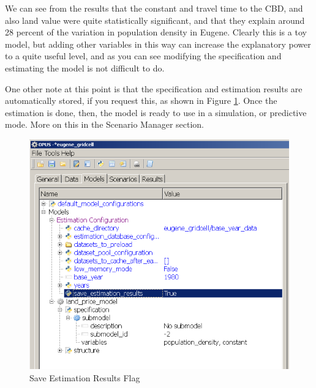 We can see from the results that the constant and travel time to the CBD, and also land value were quite statistically significant, and that they explain around 28 percent of the variation in population density in Eugene.  Clearly this is a toy model, but adding other variables in this way can increase the explanatory power to a quite useful level, and as you can see modifying the specification and estimating the model is not difficult to do.

One other note at this point is that the specification and estimation results are automatically stored, if you request this, as shown in Figure  \ref{fig:save-estimation}.  Once the estimation is done, then, the model is ready to use in a simulation, or predictive mode.  More on this in the Scenario Manager section.

\begin{figure}[htp]
\begin{center}
\includegraphics[scale=0.6]{part-gui/images/model-manager-save-estimation.png}
\end{center}
\caption{Save Estimation Results Flag}
\label{fig:save-estimation}
\end{figure}



